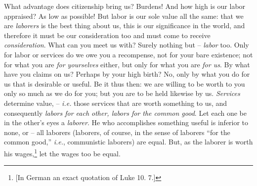 \documentclass[12pt,a4paper]{book}
\begin{document}
What advantage does citizenship bring us? Burdens! And how high is our labor 
appraised? As low as possible! But labor is our sole value all the same: that 
we are \textit{laborers} is the best thing about us, this is our significance 
in the world, and therefore it must be our consideration too and must come to 
receive \textit{consideration}. What can you meet us with? Surely nothing but 
-- \textit{labor} too. Only for labor or services do we owe you a recompense, 
not for your bare existence; not for what you are \textit{for yourselves} 
either, but only for what you are \textit{for us}. By what have you claims on 
us? Perhaps by your high birth? No, only by what you do for us that is 
desirable or useful. Be it thus then: we are willing to be worth to you only 
so much as we do for you; but you are to be held likewise by us. 
\textit{Services} determine value, -- \textit{i.e.} those services that are 
worth something to us, and consequently \textit{labors for each other, labors 
for the common good}. Let each one be in the other's eyes a \textit{laborer}. 
He who accomplishes something useful is inferior to none, or -- all laborers 
(laborers, of course, in the sense of laborers ``for the common good,'' 
\textit{i.e.}, communistic laborers) are equal. But, as the laborer is worth 
his wages,\footnote{[In German an exact quotation of Luke 10. 7.]} let the 
wages too be equal.
\end{document}
